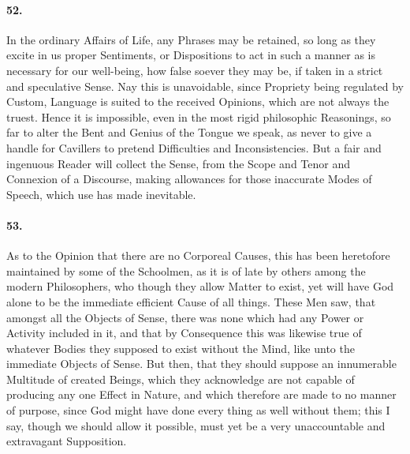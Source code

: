\documentclass[]{article}
\newenvironment{sectionbody}{}{}
\begin{document}
\begin{sectionbody}
\paragraph{52.} In the ordinary Affairs of Life, any Phrases may be retained, so
long as they excite in us proper Sentiments, or Dispositions to
act in such a manner as is necessary for our well-being, how
false soever they may be, if taken in a strict and speculative
Sense.  Nay this is unavoidable, since Propriety being regulated
by Custom, Language is suited to the received Opinions, which are
not always the truest.  Hence it is impossible, even in the most
rigid philosophic Reasonings, so far to alter the Bent and Genius
of the Tongue we speak, as never to give a handle for Cavillers
to pretend Difficulties and Inconsistencies.  But a fair and
ingenuous Reader will collect the Sense, from the Scope and Tenor
and Connexion of a Discourse, making allowances for those
inaccurate Modes of Speech, which use has made inevitable.



\paragraph{53.} As to the Opinion that there are no Corporeal Causes, this has
been heretofore maintained by some of the Schoolmen, as it is of
late by others among the modern Philosophers, who though they
allow Matter to exist, yet will have {\sc God} alone to be the
immediate efficient Cause of all things.  These Men saw, that
amongst all the Objects of Sense, there was none which had any
Power or Activity included in it, and that by Consequence this
was likewise true of whatever Bodies they supposed to exist
without the Mind, like unto the immediate Objects of Sense.  But
then, that they should suppose an innumerable Multitude of
created Beings, which they acknowledge are not capable of
producing any one Effect in Nature, and which therefore are made
to no manner of purpose, since God might have done every thing as
well without them; this I say, though we should allow it
possible, must yet be a very unaccountable and extravagant
Supposition.




\end{sectionbody}
\end{document}
